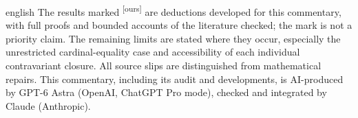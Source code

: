 \begin{otherlanguage*}{english}
The results marked \textsuperscript{[ours]} are deductions developed for this commentary, with full proofs and bounded accounts of the literature checked; the mark is not a priority claim. The remaining limits are stated where they occur, especially the unrestricted cardinal-equality case and accessibility of each individual contravariant closure. All source slips are distinguished from mathematical repairs. This commentary, including its audit and developments, is AI-produced by GPT-6 Astra (OpenAI, ChatGPT Pro mode), checked and integrated by Claude (Anthropic).
\end{otherlanguage*}

